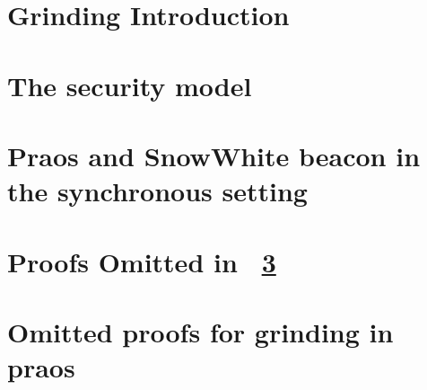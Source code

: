 \chapter{Grinding Introduction }\label{ch:grinding-intro}


\chapter{The security model}\label{sec:model-grinding}


% 

\chapter{Praos and SnowWhite beacon in the synchronous setting}\label{sec:praos}


\chapter{Proofs Omitted in \Section~\ref{sec:praos}}\label{sec:praos-claims}


\chapter{Omitted proofs for grinding in praos}\label{app:grinding-praos}

